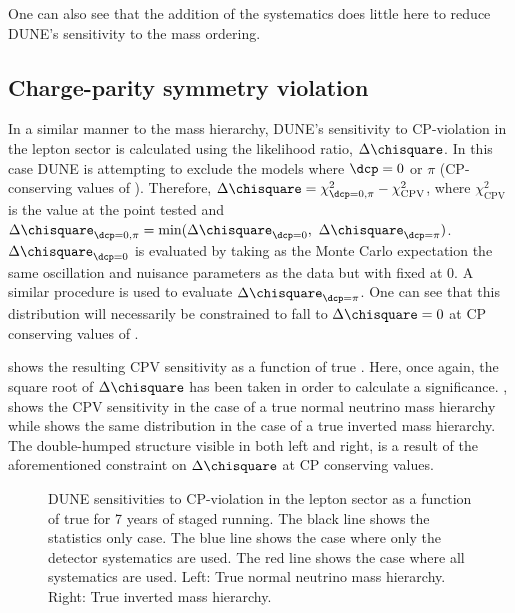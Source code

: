 One can also see that the addition of the systematics does little here to reduce DUNE's sensitivity to the mass ordering.

\subsection{Charge-parity symmetry violation}
\label{sec:dune_lbl:sensitivities:cpv}

In a similar manner to the mass hierarchy, DUNE's sensitivity to CP-violation in the lepton sector is calculated using the likelihood ratio, $\Delta \chisquare$.
In this case DUNE is attempting to exclude the models where $\dcp = 0$ or $\pi$ (CP-conserving values of \dcp).
Therefore, $\Delta \chisquare = \chi^{2}_{\dcp=0,\pi} - \chi^{2}_{\text{CPV}}$, where $\chi^{2}_{\text{CPV}}$ is the \chisquare value at the \dcp point tested and $\Delta \chisquare_{\dcp=0,\pi} = \min(\Delta \chisquare_{\dcp=0},~\Delta \chisquare_{\dcp=\pi})$.
$\Delta \chisquare_{\dcp=0}$ is evaluated by taking as the Monte Carlo expectation the same oscillation and nuisance parameters as the data but with \dcp fixed at 0.
A similar procedure is used to evaluate $\Delta \chisquare_{\dcp=\pi}$.
One can see that this distribution will necessarily be constrained to fall to $\Delta \chisquare = 0$ at CP conserving values of \dcp.

 shows the resulting CPV sensitivity as a function of true \dcp.
Here, once again, the square root of $\Delta\chisquare$ has been taken in order to calculate a significance.
, shows the CPV sensitivity in the case of a true normal neutrino mass hierarchy while  shows the same distribution in the case of a true inverted mass hierarchy.
The double-humped structure visible in both  left and right, is a result of the aforementioned constraint on $\Delta\chisquare$ at CP conserving values.

\begin{figure}[h]
	\begin{minipage}[t]{.5\linewidth}
		\begin{adjustbox}{max totalsize=\linewidth, center}
			
		\end{adjustbox}
	\end{minipage}
	\hfill
	\begin{minipage}[t]{.5\linewidth}
		\begin{adjustbox}{max totalsize=\linewidth, center}
			
		\end{adjustbox}
	\end{minipage}
	\caption[DUNE sensitivities to CP-violation in the lepton sector as a function of true \dcp.]{DUNE sensitivities to CP-violation in the lepton sector as a function of true \dcp for 7 years of staged running. The black line shows the statistics only case. The blue line shows the case where only the detector systematics are used. The red line shows the case where all systematics are used. Left: True normal neutrino mass hierarchy. Right: True inverted mass hierarchy.}
	\label{fig:cpvSens}
\end{figure}

